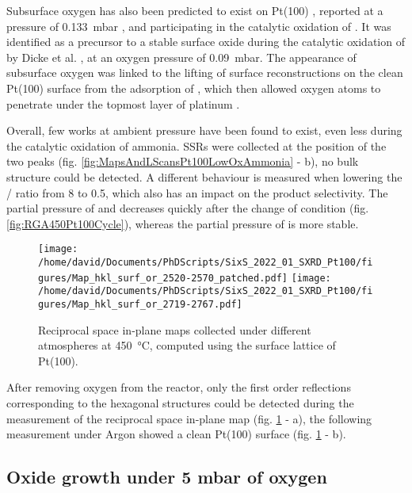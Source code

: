 Subsurface oxygen has also been predicted to exist on Pt(100) \parencite{Gu2007}, reported at a pressure of \qty{0.133}{\milli\bar} \parencite{McMillan2005}, and participating in the catalytic oxidation of .
It was identified as a precursor to a stable surface oxide during the catalytic oxidation of  by Dicke et al. \parencite*{Dicke2000}, at an oxygen pressure of \qty{0.09}{\milli\bar}.
The appearance of subsurface oxygen was linked to the lifting of surface reconstructions on the clean Pt(100) surface from the adsorption of , which then allowed oxygen atoms to penetrate under the topmost layer of platinum \parencite{Rotermund1993, Lauterbach1994}.

Overall, few works at ambient pressure have been found to exist, even less during the catalytic oxidation of ammonia.
SSRs were collected at the position of the two peaks (fig. \ref{fig:MapsAndLScansPt100LowOxAmmonia} - b), no bulk structure could be detected.
A different behaviour is measured when lowering the / ratio from \num{8} to \num{0.5}, which also has an impact on the product selectivity.
The partial pressure of  and  decreases quickly after the change of condition (fig. \ref{fig:RGA450Pt100Cycle}), whereas the partial pressure of  is more stable.

\begin{figure}[!htb]
    \centering
    \texttt{[image: /home/david/Documents/PhDScripts/SixS\_2022\_01\_SXRD\_Pt100/figures/Map\_hkl\_surf\_or\_2520-2570\_patched.pdf]}
    \texttt{[image: /home/david/Documents/PhDScripts/SixS\_2022\_01\_SXRD\_Pt100/figures/Map\_hkl\_surf\_or\_2719-2767.pdf]}
    \caption{
        Reciprocal space in-plane maps collected under different atmospheres at \qty{450}{\degreeCelsius}, computed using the surface lattice of Pt(100).
    }
    \label{fig:MapsPt100C}
\end{figure}

After removing oxygen from the reactor, only the first order reflections corresponding to the hexagonal structures could be detected during the measurement of the reciprocal space in-plane map (fig. \ref{fig:MapsPt100C} - a), the following measurement under Argon showed a clean Pt(100) surface (fig. \ref{fig:MapsPt100C} - b).

\subsection{Oxide growth under 5 mbar of oxygen}

